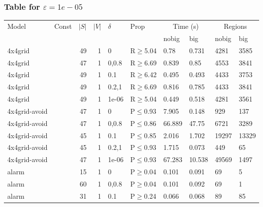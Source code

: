\subsubsection{Table for \(\varepsilon=1e-05\)}
\begin{longtable}{llrrllllll}

        \toprule
        Model & Const & $|S|$ & $|V|$ & $\delta$ & Prop & \multicolumn{2}{c}{Time (s)} & \multicolumn{2}{c}{Regions} \\
        \cmidrule(ll){7-8} \cmidrule(ll){9-10}
        & & & & & & nobig & big & nobig & big \\
        \midrule
        
 4x4grid       &          &     	49 & 1 & 0     & R$\geq$5.04  & 0.78     & 0.731    & 4281    & 3585   \\
 4x4grid       &          &     	47 & 1 & 0,0.8 & R$\geq$6.69  & 0.839    & 0.85     & 4553    & 3841   \\
 4x4grid       &          &     	49 & 1 & 0.1   & R$\geq$6.42  & 0.495    & 0.493    & 4433    & 3753   \\
 4x4grid       &          &     	49 & 1 & 0.2,1 & R$\geq$6.69  & 0.816    & 0.785    & 4433    & 3841   \\
 4x4grid       &          &     	49 & 1 & 1e-06 & R$\geq$5.04  & 0.449    & 0.518    & 4281    & 3561   \\
 4x4grid-avoid &          &     	47 & 1 & 0     & P$\leq$0.93  & 7.905    & 0.148    & 929     & 137    \\
 4x4grid-avoid &          &     	47 & 1 & 0,0.8 & P$\leq$0.86  & 66.889   & 47.75    & 6721    & 3289   \\
 4x4grid-avoid &          &     	45 & 1 & 0.1   & P$\leq$0.85  & 2.016    & 1.702    & 19297   & 13329  \\
 4x4grid-avoid &          &     	45 & 1 & 0.2,1 & P$\leq$0.93  & 1.715    & 0.073    & 449     & 65     \\
 4x4grid-avoid &          &     	47 & 1 & 1e-06 & P$\leq$0.93  & 67.283   & 10.538   & 49569   & 1497   \\
 alarm         &          &     	15 & 1 & 0     & P$\geq$0.04  & 0.101    & 0.091    & 69      & 5      \\
 alarm         &          &     	60 & 1 & 0,0.8 & P$\geq$0.04  & 0.101    & 0.092    & 69      & 1      \\
 alarm         &          &     	31 & 1 & 0.1   & P$\geq$0.24  & 0.066    & 0.068    & 89      & 85     \\

\end{longtable}
